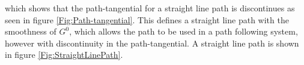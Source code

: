 which shows that the path-tangential for a straight line path is discontinues as seen in figure \ref{Fig:Path-tangential}. This defines a straight line path with the smoothness of $G^0$, which allows the path to be used in a path following system, however with discontinuity in the path-tangential. A straight line path is shown in  figure \ref{Fig:StraightLinePath}.

